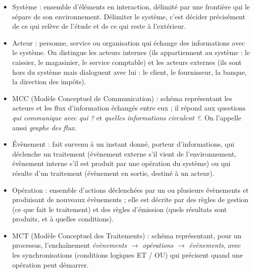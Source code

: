 \documentclass[11pt]{article}
\newcommand{\cle}[1]{{\popxbold\color{popdark}#1}}
\begin{document}
\begin{aretenir}
\begin{itemize}
  \item \cle{Système} : ensemble d'éléments en interaction, délimité par une \cle{frontière} qui le sépare de son environnement. Délimiter le système, c'est décider précisément de ce qui relève de l'étude et de ce qui reste à l'extérieur.
  \item \cle{Acteur} : personne, service ou organisation qui échange des informations avec le système. On distingue les \cle{acteurs internes} (ils appartiennent au système : le caissier, le magasinier, le service comptable) et les \cle{acteurs externes} (ils sont hors du système mais dialoguent avec lui : le client, le fournisseur, la banque, la direction des impôts).
  \item \cle{MCC} (Modèle Conceptuel de Communication) : schéma représentant les acteurs et les \cle{flux d'information} échangés entre eux ; il répond aux questions \emph{qui communique avec qui ?} et \emph{quelles informations circulent ?}. On l'appelle aussi \emph{graphe des flux}.
  \item \cle{Évènement} : fait survenu à un instant donné, porteur d'informations, qui déclenche un traitement (\cle{évènement externe} s'il vient de l'environnement, \cle{évènement interne} s'il est produit par une opération du système) ou qui résulte d'un traitement (\cle{évènement en sortie}, destiné à un acteur).
  \item \cle{Opération} : ensemble d'actions déclenchées par un ou plusieurs évènements et produisant de nouveaux évènements ; elle est décrite par des \cle{règles de gestion} (ce que fait le traitement) et des \cle{règles d'émission} (quels résultats sont produits, et à quelles conditions).
  \item \cle{MCT} (Modèle Conceptuel des Traitements) : schéma représentant, pour un processus, l'enchaînement \emph{évènements $\to$ opérations $\to$ évènements}, avec les \cle{synchronisations} (conditions logiques ET / OU) qui précisent quand une opération peut démarrer.
\end{itemize}
\end{aretenir}
\end{document}
